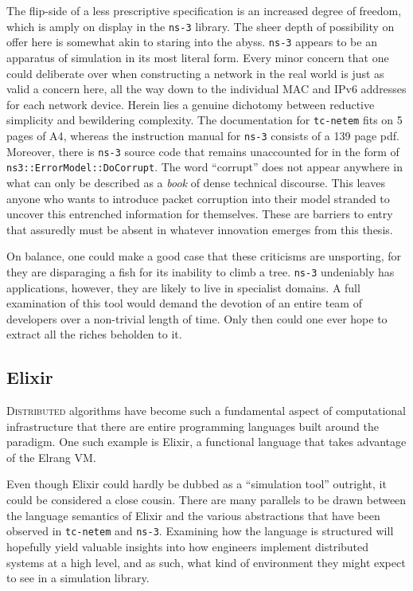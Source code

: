 The flip-side of a less prescriptive specification is an increased degree of freedom, which is amply on display in
the \texttt{ns-3} library. The sheer depth of possibility on offer here is somewhat akin to staring into the abyss.
\texttt{ns-3} appears to be an apparatus of simulation in its most literal form. Every minor concern that one could
deliberate over when constructing a network in the real world is just as valid a concern here, all the way down to
the individual MAC and IPv6 addresses for each network device. Herein lies a genuine dichotomy between reductive
simplicity and bewildering complexity. The documentation for \texttt{tc-netem} fits on 5 pages of
A4\cite{tc_netem_8_man}, whereas the instruction manual for \texttt{ns-3} consists of a 139 page pdf\cite{ns_3_man_pdf}.
Moreover, there is \texttt{ns-3} source code that remains unaccounted for in the form of
\texttt{ns3::ErrorModel::DoCorrupt}. The word ``corrupt'' does not appear anywhere in what can only be described as
a \emph{book} of dense technical discourse. This leaves anyone who wants to introduce packet corruption into their
model stranded to uncover this entrenched information for themselves. These are barriers to entry that assuredly must
be absent in whatever innovation emerges from this thesis.

On balance, one could make a good case that these criticisms are unsporting, for they are disparaging a fish for its
inability to climb a tree\cite{einstein_quotes}. \texttt{ns-3} undeniably has applications, however, they are likely
to live in specialist domains. A full examination of this tool would demand the devotion of an entire team of
developers over a non-trivial length of time. Only then could one ever hope to extract all the riches beholden to it.

\subsection{Elixir}

\lettrine{D}{istributed} algorithms have become such a fundamental aspect of computational infrastructure that there
are entire programming languages built around the paradigm. One such example is Elixir, a functional language that
takes advantage of the Elrang VM\cite{elixir, erlang}.

Even though Elixir could hardly be dubbed as a ``simulation tool'' outright, it could be considered a close cousin.
There are many parallels to be drawn between the language semantics of Elixir and the various abstractions that
have been observed in \texttt{tc-netem} and \texttt{ns-3}. Examining how the language is structured will hopefully
yield valuable insights into how engineers implement distributed systems at a high level, and as such, what kind of
environment they might expect to see in a simulation library.

